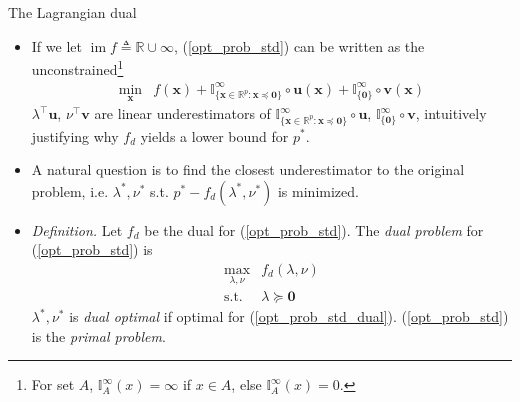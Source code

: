 \documentclass{beamer}
\numberwithin{equation}{section}
\newcommand{\aref}[1]{\alert{\ref{#1}}}
\begin{document}
\begin{frame}{The Lagrangian dual}
    \begin{itemize}
        \item
        If we let $ \operatorname{im}f \triangleq \mathbb{R}\cup\infty $,
        (\aref{opt_prob_std}) can be written as the unconstrained\footnote{
            For set $ A $, $ \mathbb{I}_A^\infty(x) = \infty $ if $ x \in A $,
            else $ \mathbb{I}_A^\infty(x) = 0 $.
        }
        \begin{equation*}
            \begin{array}{ll}
                \displaystyle\min_\mathbf{x} &
                \displaystyle f(\mathbf{x}) + \mathbb{I}^\infty_{\{
                    \mathbf{x} \in \mathbb{R}^p : \mathbf{x}\preceq \mathbf{0}
                \}}\circ\mathbf{u}(\mathbf{x}) +
                \mathbb{I}^\infty_{\{\mathbf{0}\}}\circ\mathbf{v}(\mathbf{x})
            \end{array}
        \end{equation*}
        $ \lambda^\top\mathbf{u} $, $ \nu^\top\mathbf{v} $ are linear
        underestimators of $ \displaystyle\mathbb{I}^\infty_{\{
            \mathbf{x} \in \mathbb{R}^p : \mathbf{x}\preceq \mathbf{0}
        \}}\circ\mathbf{u} $, $ \displaystyle
        \mathbb{I}^\infty_{\{\mathbf{0}\}}\circ\mathbf{v} $, intuitively
        justifying why $ f_d $ yields a lower bound for $ p^* $.

        \item
        A natural question is to find the closest underestimator to the
        original problem, i.e. $ \lambda^*, \nu^* $ s.t.
        $ p^* - f_d(\lambda^*, \nu^*) $ is minimized.

        \item
        \textit{Definition.} Let $ f_d $ be the dual for
        (\aref{opt_prob_std}). The \textit{dual problem} for
        (\aref{opt_prob_std}) is
        \begin{equation} \label{opt_prob_std_dual}
            \begin{array}{ll}
                \displaystyle\max_{\lambda, \nu}& f_d(\lambda, \nu) \\
                \text{s.t.} & \lambda\succeq \mathbf{0}
            \end{array}
        \end{equation}
        $ \lambda^*, \nu^* $ is \textit{dual optimal} if optimal for
        (\aref{opt_prob_std_dual}). (\aref{opt_prob_std}) is the
        \textit{primal problem}.
    \end{itemize}

    \bigskip
\end{frame}
\end{document}
